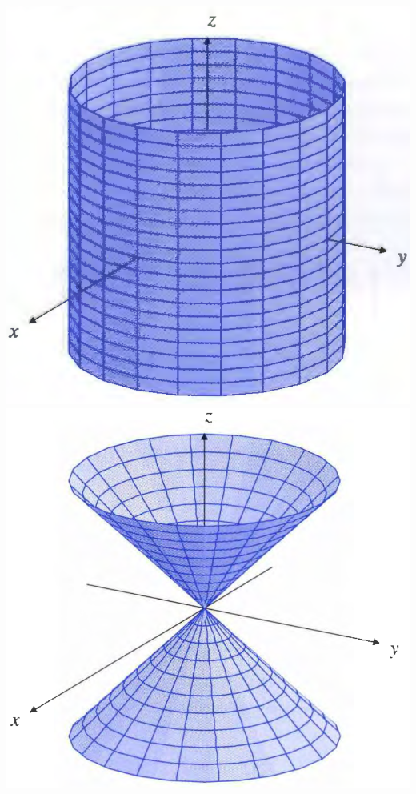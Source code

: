 \begin{spacing}{1.3}
    \begin{center}
        \includegraphics[scale=0.3]{images/Ch10-cylinder.png}
        \hspace{1in}
        \includegraphics[scale=0.3]{images/Ch10-cone.png}
    \end{center}
    


\end{spacing}

